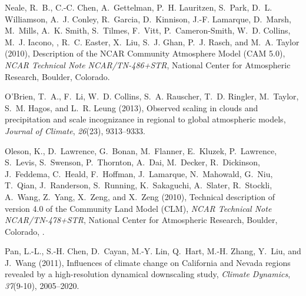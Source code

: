 \documentclass[ms,draft]{agutex}   %
\begin{document}
\begin{article}
\begin{thebibliography}{84}
Neale, R.~B., C.-C. Chen, A.~Gettelman, P.~H. Lauritzen, S.~Park, D.~L.
  Williamson, A.~J. Conley, R.~Garcia, D.~Kinnison, J.-F. Lamarque, D.~Marsh,
  M.~Mills, A.~K. Smith, S.~Tilmes, F.~Vitt, P.~Cameron-Smith, W.~D. Collins,
  M.~J. Iacono, , R.~C. Easter, X.~Liu, S.~J. Ghan, P.~J. Rasch, and M.~A.
  Taylor (2010{}), Description of the {NCAR} {C}ommunity
  {A}tmosphere {M}odel ({CAM} 5.0), \textit{NCAR Technical Note
  NCAR/TN-486+STR}, National Center for Atmospheric Research, Boulder,
  Colorado.

O'Brien, T.~A., F.~Li, W.~D. Collins, S.~A. Rauscher, T.~D. Ringler, M.~Taylor,
  S.~M. Hagos, and L.~R. Leung (2013), {Observed scaling in clouds and
  precipitation and scale incognizance in regional to global atmospheric
  models}, \textit{Journal of Climate}, \textit{26}(23), 9313--9333.

Oleson, K., D.~Lawrence, G.~Bonan, M.~Flanner, E.~Kluzek, P.~Lawrence,
  S.~Levis, S.~Swenson, P.~Thornton, A.~Dai, M.~Decker, R.~Dickinson,
  J.~Feddema, C.~Heald, F.~Hoffman, J.~Lamarque, N.~Mahowald, G.~Niu, T.~Qian,
  J.~Randerson, S.~Running, K.~Sakaguchi, A.~Slater, R.~Stockli, A.~Wang,
  Z.~Yang, X.~Zeng, and X.~Zeng (2010), Technical description of version 4.0 of
  the {C}ommunity {L}and {M}odel ({CLM}), \textit{NCAR Technical Note
  NCAR/TN-478+STR}, National Center for Atmospheric Research, Boulder,
  Colorado, .

Pan, L.-L., S.-H. Chen, D.~Cayan, M.-Y. Lin, Q.~Hart, M.-H. Zhang, Y.~Liu, and
  J.~Wang (2011), {Influences of climate change on California and Nevada
  regions revealed by a high-resolution dynamical downscaling study},
  \textit{Climate Dynamics}, \textit{37}(9-10), 2005--2020.


\end{thebibliography}
\end{article}
\end{document}
